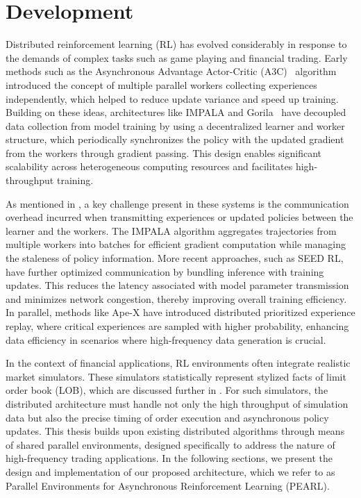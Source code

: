 \chapter{Development}
\label{ch:development}
Distributed reinforcement learning (RL) has evolved considerably in response to the demands of complex tasks such as game playing and financial trading.
Early methods such as the Asynchronous Advantage Actor-Critic (A3C)~\citep{Mnih2016}
algorithm introduced the concept of multiple parallel workers collecting experiences independently,
which helped to reduce update variance and speed up training.
Building on these ideas, architectures like IMPALA and Gorila~\citep{Espeholt2018,Nair2015} have decoupled data collection from model training by using
a decentralized learner and worker structure, which periodically synchronizes the policy with the updated gradient
from the workers through gradient passing.
This design enables significant scalability across heterogeneous computing resources and facilitates high-throughput training.

As mentioned in , a key challenge present in these systems is the communication overhead incurred when transmitting experiences or
updated policies between the learner and the workers.
The IMPALA algorithm aggregates trajectories from multiple workers into
batches for efficient gradient computation while managing the staleness of policy information.
More recent approaches, such as SEED RL\citep{Espeholt2020}, have further optimized communication by bundling inference with training updates.
This reduces the latency associated with model parameter transmission and minimizes network congestion, thereby improving overall training efficiency.
In parallel, methods like Ape-X\citep{Horgan2018} have introduced distributed prioritized experience replay, where critical experiences are sampled with higher probability,
enhancing data efficiency in scenarios where high-frequency data generation is crucial.

In the context of financial applications, RL environments often integrate realistic market simulators.
These simulators statistically represent stylized facts of limit order book (LOB), which are discussed
further in .
For such simulators, the distributed architecture must handle not only the high throughput of simulation data but also the
precise timing of order execution and asynchronous policy updates.
This thesis builds upon existing distributed algorithms through means of shared parallel environments,
designed specifically to address the nature of high-frequency trading applications.
In the following sections, we present the design and implementation of our proposed architecture,
which we refer to as Parallel Environments for Asynchronous Reinforcement Learning (PEARL).

